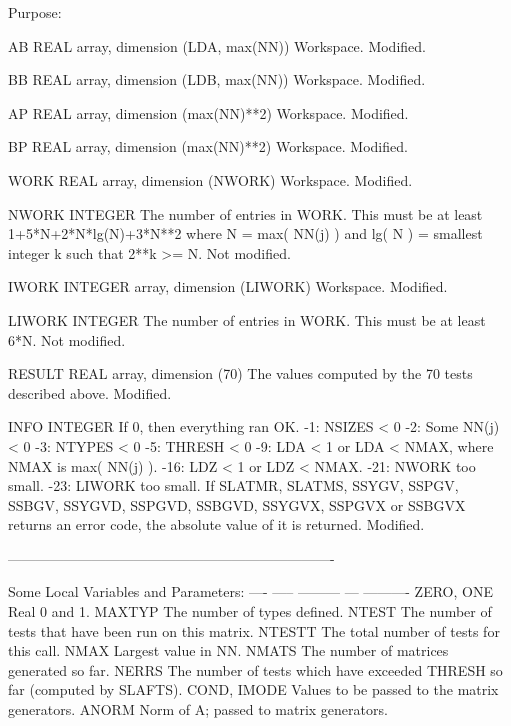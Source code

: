 \begin{DoxyParagraph}{Purpose\+: }
\begin{DoxyVerb}
  AB      REAL array, dimension (LDA, max(NN))
          Workspace.
          Modified.

  BB      REAL array, dimension (LDB, max(NN))
          Workspace.
          Modified.

  AP      REAL array, dimension (max(NN)**2)
          Workspace.
          Modified.

  BP      REAL array, dimension (max(NN)**2)
          Workspace.
          Modified.

  WORK    REAL array, dimension (NWORK)
          Workspace.
          Modified.

  NWORK   INTEGER
          The number of entries in WORK.  This must be at least
          1+5*N+2*N*lg(N)+3*N**2 where N = max( NN(j) ) and
          lg( N ) = smallest integer k such that 2**k >= N.
          Not modified.

  IWORK   INTEGER array, dimension (LIWORK)
          Workspace.
          Modified.

  LIWORK  INTEGER
          The number of entries in WORK.  This must be at least 6*N.
          Not modified.

  RESULT  REAL array, dimension (70)
          The values computed by the 70 tests described above.
          Modified.

  INFO    INTEGER
          If 0, then everything ran OK.
           -1: NSIZES < 0
           -2: Some NN(j) < 0
           -3: NTYPES < 0
           -5: THRESH < 0
           -9: LDA < 1 or LDA < NMAX, where NMAX is max( NN(j) ).
          -16: LDZ < 1 or LDZ < NMAX.
          -21: NWORK too small.
          -23: LIWORK too small.
          If  SLATMR, SLATMS, SSYGV, SSPGV, SSBGV, SSYGVD, SSPGVD,
              SSBGVD, SSYGVX, SSPGVX or SSBGVX returns an error code,
              the absolute value of it is returned.
          Modified.

 ----------------------------------------------------------------------

       Some Local Variables and Parameters:
       ---- ----- --------- --- ----------
       ZERO, ONE       Real 0 and 1.
       MAXTYP          The number of types defined.
       NTEST           The number of tests that have been run
                       on this matrix.
       NTESTT          The total number of tests for this call.
       NMAX            Largest value in NN.
       NMATS           The number of matrices generated so far.
       NERRS           The number of tests which have exceeded THRESH
                       so far (computed by SLAFTS).
       COND, IMODE     Values to be passed to the matrix generators.
       ANORM           Norm of A; passed to matrix generators.


\end{DoxyVerb}
\end{DoxyParagraph}
